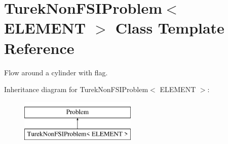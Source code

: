 \hypertarget{classTurekNonFSIProblem}{}\section{Turek\+Non\+F\+S\+I\+Problem$<$ E\+L\+E\+M\+E\+NT $>$ Class Template Reference}
\label{classTurekNonFSIProblem}


Flow around a cylinder with flag.  


Inheritance diagram for Turek\+Non\+F\+S\+I\+Problem$<$ E\+L\+E\+M\+E\+NT $>$\+:\begin{figure}[H]
\begin{center}
\leavevmode
\includegraphics[height=2.000000cm]{classTurekNonFSIProblem}
\end{center}
\end{figure}
